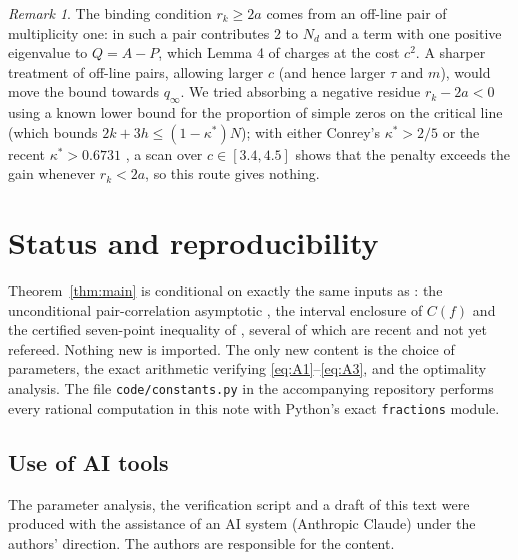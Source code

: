 \documentclass[reqno,11pt]{amsart}
\numberwithin{equation}{section}
\theoremstyle{plain}
\theoremstyle{remark}
\newtheorem{remark}[theorem]{Remark}
\begin{document}
\begin{remark}
The binding condition $r_k\ge2a$ comes from an off-line pair of
multiplicity one: in \cite{Kna26} such a pair contributes $2$ to $N_d$ and a
term with one positive eigenvalue to $Q=A-P$, which Lemma 4 of \cite{Kna26}
charges at the cost $c^2$. A sharper treatment of off-line pairs, allowing
larger $c$ (and hence larger $\tau$ and $m$), would move the bound towards
$q_\infty$. We tried absorbing a negative residue $r_k-2a<0$ using a known
lower bound for the proportion of simple zeros on the critical line (which
bounds $2k+3h\le(1-\kappa^*)N$); with either Conrey's $\kappa^*>2/5$
\cite{Con89} or the recent $\kappa^*>0.6731$ \cite{TG26}, a scan over $c\in[3.4,4.5]$ shows that
the penalty exceeds the gain whenever $r_k<2a$, so this route gives nothing.
\end{remark}

\section{Status and reproducibility}

Theorem~\ref{thm:main} is conditional on exactly the same inputs as
\cite{Kna26}: the unconditional pair-correlation asymptotic \cite{BGST24},
the interval enclosure of $C(f)$ and the certified seven-point inequality of
\cite{TRM26}, several of which are recent and not yet refereed. Nothing new
is imported. The only new content is the choice of parameters, the exact
arithmetic verifying \eqref{eq:A1}--\eqref{eq:A3}, and the optimality
analysis. The file \texttt{code/constants.py} in the accompanying repository
performs every rational computation in this note with Python's exact
\texttt{fractions} module.

\subsection*{Use of AI tools}
The parameter analysis, the verification script and a draft of this text
were produced with the assistance of an AI system (Anthropic Claude) under
the authors' direction. The authors are responsible for the content.
\end{document}
